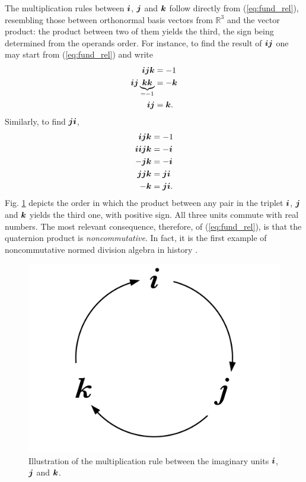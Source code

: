 The multiplication rules between  $ \boldsymbol{i} $, $ \boldsymbol{j} $ and $ \boldsymbol{k} $ follow directly from (\ref{eq:fund_rel}), resembling those between orthonormal basis vectors from $ \mathbb{R}^3 $ and the vector product: the product between two of them yields the third, the sign being determined from the operands order. For instance, to find the result of $ \boldsymbol{i} \boldsymbol{j} $ one may start from (\ref{eq:fund_rel}) and write
\begin{equation}
    \begin{aligned}
        \boldsymbol{i} \boldsymbol{j} \boldsymbol{k}                         & = -1   \\
        \boldsymbol{i} \boldsymbol{j} \underbrace{\boldsymbol{k} \boldsymbol{k}}_{= -1} & = -\boldsymbol{k} \\
        \boldsymbol{i} \boldsymbol{j}                             & = \boldsymbol{k}.
    \end{aligned}
\end{equation}
Similarly, to find $ \boldsymbol{j} \boldsymbol{i} $,
\begin{equation}
    \begin{aligned}
        \boldsymbol{i} \boldsymbol{j} \boldsymbol{k}     & = -1        \\
        \boldsymbol{i} \boldsymbol{i} \boldsymbol{j} \boldsymbol{k} & = -\boldsymbol{i}      \\
        - \boldsymbol{j} \boldsymbol{k}       & = - \boldsymbol{i}     \\
        \boldsymbol{j} \boldsymbol{j} \boldsymbol{k}     & =  \boldsymbol{j} \boldsymbol{i}  \\
        - \boldsymbol{k}           & =  \boldsymbol{j} \boldsymbol{i}. \\
    \end{aligned}
\end{equation}
Fig. \ref{fig:quatmult} depicts the order in which the product between any pair in the triplet $ \boldsymbol{i} $, $ \boldsymbol{j} $ and $ \boldsymbol{k} $ yields the third one, with positive sign. All three units commute with real numbers. The most relevant consequence, therefore, of (\ref{eq:fund_rel}), is that the quaternion product is \textit{noncommutative}. In fact, it is the first example of noncommutative normed division algebra in history \cite{kleiner2007history}.

\begin{figure}
    \centering
    \includegraphics[width=0.2\linewidth]{Figures/quaternion_multiplication.pdf}
    \caption{Illustration of the multiplication rule between the imaginary units $ \boldsymbol{i} $, $ \boldsymbol{j} $ and $ \boldsymbol{k} $.}
    \label{fig:quatmult}
\end{figure}

